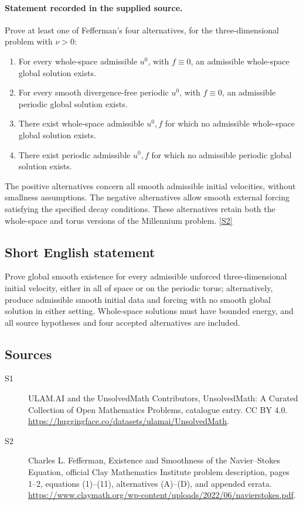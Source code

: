 \documentclass[11pt]{article}
\newcommand{\sref}[2]{\hyperlink{source:#1:#2}{[S#2]}}
\begin{document}
\paragraph{Statement recorded in the supplied source.}
Prove at least one of Fefferman's four alternatives, for the three-dimensional problem with $\nu>0$:
\begin{enumerate}
\item[(A)] For every whole-space admissible $u^0$, with $f\equiv0$, an admissible whole-space global solution exists.
\item[(B)] For every smooth divergence-free periodic $u^0$, with $f\equiv0$, an admissible periodic global solution exists.
\item[(C)] There exist whole-space admissible $u^0,f$ for which no admissible whole-space global solution exists.
\item[(D)] There exist periodic admissible $u^0,f$ for which no admissible periodic global solution exists.
\end{enumerate}
The positive alternatives concern all smooth admissible initial velocities, without smallness assumptions. The negative alternatives allow smooth external forcing satisfying the specified decay conditions. These alternatives retain both the whole-space and torus versions of the Millennium problem. \sref{statement}{2}
\subsection{Short English statement}
Prove global smooth existence for every admissible unforced three-dimensional initial velocity, either in all of space or on the periodic torus; alternatively, produce admissible smooth initial data and forcing with no smooth global solution in either setting. Whole-space solutions must have bounded energy, and all source hypotheses and four accepted alternatives are included.
\subsection{Sources}
\begin{description}
\item[\hypertarget{source:statement:1}{S1}] ULAM.AI and the UnsolvedMath Contributors, UnsolvedMath: A Curated Collection of Open Mathematics Problems, catalogue entry. CC BY 4.0. \url{https://huggingface.co/datasets/ulamai/UnsolvedMath}.
\item[\hypertarget{source:statement:2}{S2}] Charles L. Fefferman, Existence and Smoothness of the Navier–Stokes Equation, official Clay Mathematics Institute problem description, pages 1--2, equations (1)--(11), alternatives (A)--(D), and appended errata. \url{https://www.claymath.org/wp-content/uploads/2022/06/navierstokes.pdf}.
\end{description}
\label{end:statement}
\end{document}
